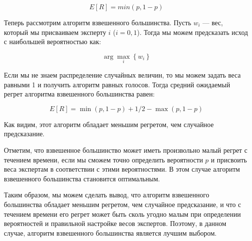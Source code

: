 \documentclass[a4paper,14pt]{extarticle}
\begin{document}
$$ E[R] = min\left(p, 1 - p\right)$$

Теперь рассмотрим алгоритм взвешенного большинства. Пусть $w_i$ — вес, который мы присваиваем эксперту $i$ ($i = 0, 1$). Тогда мы можем предсказать исход с наибольшей вероятностью как:

$$
\arg \max _i\left\{w_i\right\}
$$

Если мы не знаем распределение случайных величин, то мы можем задать веса равными 1 и получить алгоритм равных голосов. Тогда средний ожидаемый регрет алгоритма взвешенного большинства равен:

$$
E[R]=\min (p, 1-p)+1 / 2-\max (p, 1-p)
$$

Как видим, этот алгоритм обладает меньшим регретом, чем случайное предсказание.

Отметим, что взвешенное большинство может иметь произвольно малый регрет с течением времени, если мы сможем точно определить вероятности $p$ и присвоить веса экспертам в соответствии с этими вероятностями. В этом случае алгоритм взвешенного большинства становится оптимальным.

Таким образом, мы можем сделать вывод, что алгоритм взвешенного большинства обладает меньшим регретом, чем случайное предсказание, и что с течением времени его регрет может быть сколь угодно малым при определении вероятностей и правильной настройке весов экспертов. Поэтому, в данном случае, алгоритм взвешенного большинства является лучшим выбором.
\end{document}
